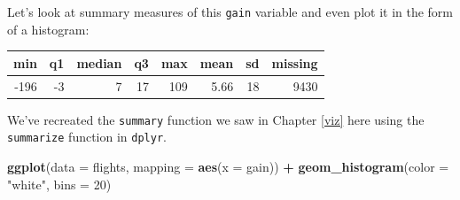 \documentclass[12pt, krantz2,]{krantz}
\makeatletter
\newenvironment{Shaded}{\begin{snugshade}}{\end{snugshade}}
\newcommand{\DataTypeTok}[1]{\textcolor[rgb]{0.27,0.27,0.27}{#1}}
\newcommand{\DecValTok}[1]{\textcolor[rgb]{0.06,0.06,0.06}{#1}}
\newcommand{\FloatTok}[1]{\textcolor[rgb]{0.06,0.06,0.06}{#1}}
\newcommand{\KeywordTok}[1]{\textcolor[rgb]{0.27,0.27,0.27}{\textbf{#1}}}
\newcommand{\NormalTok}[1]{#1}
\newcommand{\OperatorTok}[1]{\textcolor[rgb]{0.43,0.43,0.43}{\textbf{#1}}}
\newcommand{\OtherTok}[1]{\textcolor[rgb]{0.37,0.37,0.37}{#1}}
\newcommand{\StringTok}[1]{\textcolor[rgb]{0.5,0.5,0.5}{#1}}
\newenvironment{kframe}{%
\medskip{}
\setlength{\fboxsep}{.8em}
 \def\at@end@of@kframe{}%
 \ifinner\ifhmode%
  \def\at@end@of@kframe{\end{minipage}}%
  \begin{minipage}{\columnwidth}%
 \fi\fi%
 \def\FrameCommand##1{\hskip\@totalleftmargin \hskip-\fboxsep
 \colorbox{shadecolor}{##1}\hskip-\fboxsep
     \hskip-\linewidth \hskip-\@totalleftmargin \hskip\columnwidth}%
 \MakeFramed {\advance\hsize-\width
   \@totalleftmargin\z@ \linewidth\hsize
   \@setminipage}}%
 {\par\unskip\endMakeFramed%
 \at@end@of@kframe}
\renewenvironment{Shaded}{\begin{kframe}}{\end{kframe}}
\makeatother
\begin{document}
Let's look at summary measures of this \texttt{gain} variable and even plot it in the form of a histogram:

\begin{Shaded}
\end{Shaded}

\begin{table}[H]
\centering\begingroup\fontsize{10}{12}\selectfont

\begin{tabular}{r|r|r|r|r|r|r|r}
\hline
min & q1 & median & q3 & max & mean & sd & missing\\
\hline
-196 & -3 & 7 & 17 & 109 & 5.66 & 18 & 9430\\
\hline
\end{tabular}
\endgroup{}
\end{table}

We've recreated the \texttt{summary} function we saw in Chapter \ref{viz} here using the \texttt{summarize} function in \texttt{dplyr}.

\begin{Shaded}
\begin{Highlighting}[]
\KeywordTok{ggplot}\NormalTok{(}\DataTypeTok{data =}\NormalTok{ flights, }\DataTypeTok{mapping =} \KeywordTok{aes}\NormalTok{(}\DataTypeTok{x =}\NormalTok{ gain)) }\OperatorTok{+}
\StringTok{  }\KeywordTok{geom_histogram}\NormalTok{(}\DataTypeTok{color =} \StringTok{"white"}\NormalTok{, }\DataTypeTok{bins =} \DecValTok{20}\NormalTok{)}
\end{Highlighting}
\end{Shaded}
\end{document}
